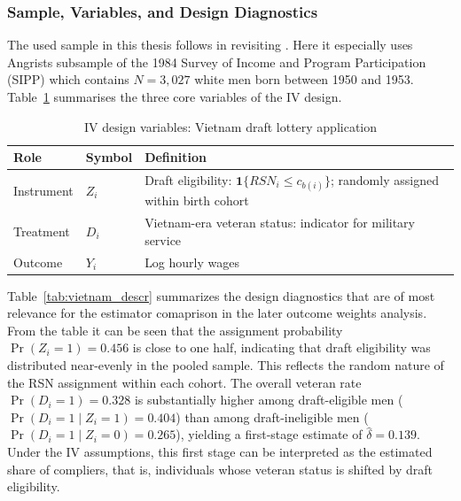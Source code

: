 \documentclass[12pt, a4paper, oneside]{article}
\theoremstyle{plain}
\theoremstyle{definition}
\newcommand{\indic}{\mathbf{1}}
\begin{document}
\subsubsection{Sample, Variables, and Design Diagnostics}
\label{subsubsec:vietnam_sample}

The used sample in this thesis follows \citet{sloczynski2025abadie} in revisiting \citet{angrist1990lifetime}.
Here it especially uses Angrists subsample of the 1984 Survey of Income and Program Participation
(SIPP) which contains $N = 3{,}027$ white men born between 1950 and
1953. Table~\ref{tab:vietnam_vars} summarises the three
core variables of the IV design.

\begin{table}[htbp]
\centering
\caption{IV design variables: Vietnam draft lottery application}
\label{tab:vietnam_vars}
\begin{tabular}{@{}llp{7.5cm}@{}}
\toprule
Role & Symbol & Definition \\
\midrule
Instrument  & $Z_i$ & Draft eligibility: $\indic\{RSN_i \leq c_{b(i)}\}$;
                       randomly assigned within birth cohort \\[4pt]
Treatment   & $D_i$ & Vietnam-era veteran status: indicator for
                       military service \\[4pt]
Outcome     & $Y_i$ & Log hourly wages \\
\bottomrule
\end{tabular}
\end{table}

Table~\ref{tab:vietnam_descr} summarizes the design diagnostics that are of most relevance for the estimator comaprison in the later outcome weights analysis.
From the table it can be seen that the assignment probability $\Pr(Z_i = 1) = 0.456$ is close to one half,
indicating that draft eligibility was distributed near-evenly in the
pooled sample. This reflects the random nature of the RSN assignment
within each cohort.
The overall veteran rate $\Pr(D_i = 1) = 0.328$ is substantially higher
among draft-eligible men ($\Pr(D_i=1 \mid Z_i=1) = 0.404$) than among
draft-ineligible men ($\Pr(D_i=1 \mid Z_i=0) = 0.265$), yielding a
first-stage estimate of $\hat\delta = 0.139$. Under the IV assumptions, this first stage can be interpreted as the estimated share of compliers, that is, individuals whose veteran status is shifted by draft eligibility.
\end{document}
